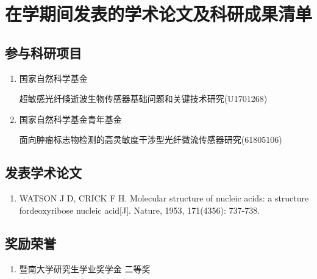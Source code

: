 
\chapter{在学期间发表的学术论文及科研成果清单}

\section*{参与科研项目}

\begin{enumerate}
	\item
	国家自然科学基金
	
	超敏感光纤倏逝波生物传感器基础问题和关键技术研究(U1701268) 
	
	\item
	国家自然科学基金青年基金
	
	面向肿瘤标志物检测的高灵敏度干涉型光纤微流传感器研究(61805106)
\end{enumerate}


\section*{发表学术论文}

\begin{enumerate}
	\item
	WATSON J D, CRICK F H.  Molecular structure of nucleic acids: a structure fordeoxyribose nucleic acid[J]. Nature, 1953, 171(4356): 737-738.

\end{enumerate}

\section*{奖励荣誉}

\begin{enumerate}
	\item 暨南大学研究生学业奖学金 \quad 二等奖

\end{enumerate}


